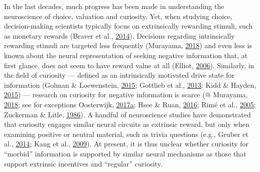 \documentclass[11pt,american,]{memoir} %
\begin{document}
In the last decades, much progress has been made in understanding the neuroscience of choice, valuation and curiosity. Yet, when studying choice, decision-making scientists typically focus on extrinsically rewarding stimuli, such as monetary rewards (Braver et al., \protect\hyperlink{ref-braver2014mechanisms}{2014}). Decisions regarding intrinsically rewarding stimuli are targeted less frequently (Murayama, \protect\hyperlink{ref-murayama2018psychological}{2018}) and even less is known about the neural representation of seeking negative information that, at first glance, does not seem to have reward value at all (Elliot, \protect\hyperlink{ref-elliot2006hierarchical}{2006}). Similarly, in the field of curiosity --- defined as an intrinsically motivated drive state for information (Golman \& Loewenstein, \protect\hyperlink{ref-golman2015curiosity}{2015}; Gottlieb et al., \protect\hyperlink{ref-gottlieb2013information}{2013}; Kidd \& Hayden, \protect\hyperlink{ref-kidd2015psychology}{2015}) --- research on curiosity for negative information is scarce (@ Murayama, \protect\hyperlink{ref-murayama2018psychological}{2018}; see for exceptions Oosterwijk, \protect\hyperlink{ref-oosterwijk2017choosing}{2017}\protect\hyperlink{ref-oosterwijk2017choosing}{a}; Hsee \& Ruan, \protect\hyperlink{ref-hsee2016pandora}{2016}; Rimé et al., \protect\hyperlink{ref-rime2005brief}{2005}; Zuckerman \& Litle, \protect\hyperlink{ref-zuckerman1986personality}{1986}). A handful of neuroscience studies have demonstrated that curiosity engages similar neural circuits as extrinsic reward, but only when examining positive or neutral material, such as trivia questions (e.g., Gruber et al., \protect\hyperlink{ref-gruber2014states}{2014}; Kang et al., \protect\hyperlink{ref-kang2009wick}{2009}). At present, it is thus unclear whether curiosity for ``morbid'' information is supported by similar neural mechanisms as those that support extrinsic incentives and ``regular'' curiosity.
\end{document}
